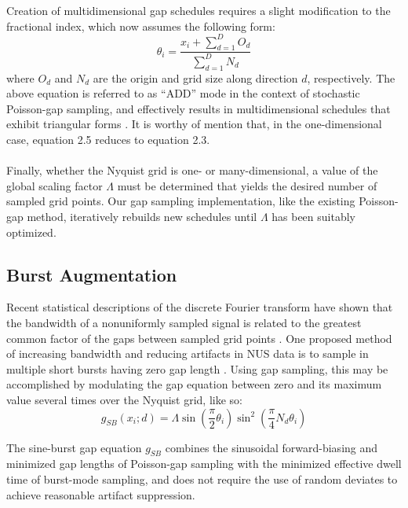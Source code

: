 \begin{doublespace}
Creation of multidimensional gap schedules requires a slight modification to
the fractional index, which now assumes the following form:
\begin{equation}
\theta_i = \frac{x_i + \sum_{d=1}^D O_d}{\sum_{d=1}^D N_d}
\end{equation}
where $O_d$ and $N_d$ are the origin and grid size along direction $d$,
respectively. The above equation is referred to as ``ADD'' mode in the context
of stochastic Poisson-gap sampling, and effectively results in multidimensional
schedules that exhibit triangular forms \cite{hyberts:jmr2014}. It is worthy of
mention that, in the one-dimensional case, equation 2.5 reduces to equation
2.3.
\\\\
Finally, whether the Nyquist grid is one- or many-dimensional, a value of the
global scaling factor $\Lambda$ must be determined that yields the desired
number of sampled grid points. Our gap sampling implementation, like the
existing Poisson-gap method, iteratively rebuilds new schedules until
$\Lambda$ has been suitably optimized.
\end{doublespace}

\subsection{Burst Augmentation}

\begin{doublespace}
Recent statistical descriptions of the discrete Fourier transform have shown
that the bandwidth of a nonuniformly sampled signal is related to the greatest
common factor of the gaps between sampled grid points
\cite{bretthorst:cmr2008}. One proposed method of increasing bandwidth and
reducing artifacts in NUS data is to sample in multiple short bursts having
zero gap length \cite{maciejewski:jmr2009}. Using gap sampling, this may be
accomplished by modulating the gap equation between zero and its maximum value
several times over the Nyquist grid, like so:
\begin{equation}
g_{SB}(x_i; d) = \Lambda
 \sin \left( \frac{\pi}{2} \theta_i \right)
 \sin^2 \left( \frac{\pi}{4} N_d \theta_i \right)
\end{equation}

The sine-burst gap equation $g_{SB}$ combines the sinusoidal forward-biasing
and minimized gap lengths of Poisson-gap sampling with the minimized effective
dwell time of burst-mode sampling, and does not require the use of random
deviates to achieve reasonable artifact suppression.
\end{doublespace}

